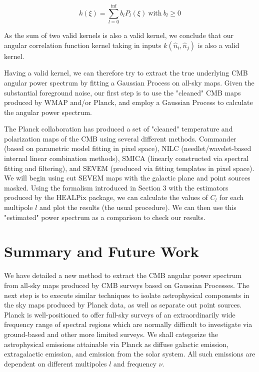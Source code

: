 \documentclass[12pt]{article}
\begin{document}
\begin{equation}
k(\xi)=\sum\limits^{\inf}_{l=0}b_lP_l(\xi) \ \mbox{with}\  b_l\geq0
\end{equation}

As the sum of two valid kernels is also a valid kernel, we conclude that our angular correlation function kernel taking in inputs $k(\hat{n}_i, \hat{n}_j)$ is also a valid kernel. 

Having a valid kernel, we can therefore try to extract the true underlying CMB angular power spectrum by fitting a Gaussian Process on all-sky maps. Given the substantial foreground noise, our first step is to use the "cleaned" CMB maps produced by WMAP and/or Planck, and employ a Gaussian Process to calculate the angular power spectrum.

The Planck collaboration has produced a set of "cleaned" temperature and polarization maps of the CMB using several different methods. Commander (based on parametric model fitting in pixel space), NILC (needlet/wavelet-based internal linear combination methods), SMICA (linearly constructed via spectral fitting and filtering), and SEVEM (produced via fitting templates in pixel space). We will begin using cut SEVEM maps with the galactic plane and point sources masked. Using the formalism introduced in Section 3 with the estimators produced by the HEALPix package, we can calculate the values of $C_l$  for each multipole $l$ and plot the results (the usual procedure). We can then use this "estimated" power spectrum as a comparison to check our results. 



\section{Summary and Future Work}
We have detailed a new method to extract the CMB angular power spectrum from all-sky maps produced by CMB surveys based on Gaussian Processes. The next step is to execute similar techniques to isolate astrophysical components in the sky maps produced by Planck data, as well as separate out point sources. Planck is well-positioned to offer full-sky surveys of an extraordinarily wide frequency range of spectral regions which are normally difficult to investigate via ground-based and other more limited surveys.  We shall categorize the astrophysical emissions attainable via Planck as diffuse galactic emission, extragalactic emission, and emission from the solar system. All such emissions are dependent on different multipoles $l$ and frequency $\nu$. 
\end{document}
